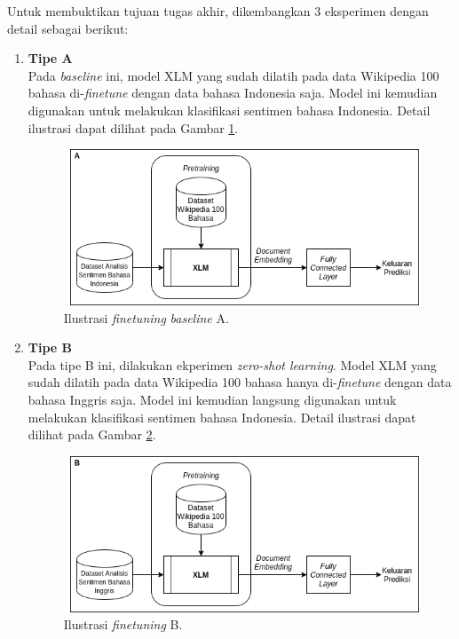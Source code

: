 	Untuk membuktikan tujuan tugas akhir, dikembangkan 3 eksperimen dengan detail sebagai berikut:
	\begin{enumerate}
		\item \textbf{Tipe A}\\
		Pada \textit{baseline} ini, model XLM yang sudah dilatih pada data Wikipedia 100 bahasa di-\textit{finetune} dengan data bahasa Indonesia saja. Model ini kemudian digunakan untuk melakukan klasifikasi sentimen bahasa Indonesia. Detail ilustrasi dapat dilihat pada Gambar \ref{fig:ilustrasi_solusi_1}.

		\begin{figure}[h]
		    \centering
		    \includegraphics[width=1\textwidth]{resources/Arsitektur-TA-1.png}
		    \caption{ Ilustrasi \textit{finetuning} \textit{baseline} A.}
		    \label{fig:ilustrasi_solusi_1}
		\end{figure}

		\item \textbf{Tipe B}\\
		Pada tipe B ini, dilakukan ekperimen \textit{zero-shot learning}. Model XLM yang sudah dilatih pada data Wikipedia 100 bahasa hanya di-\textit{finetune} dengan data bahasa Inggris saja. Model ini kemudian langsung digunakan untuk melakukan klasifikasi sentimen bahasa Indonesia. Detail ilustrasi dapat dilihat pada Gambar \ref{fig:ilustrasi_solusi_2}.

		\begin{figure}[h]
		    \centering
		    \includegraphics[width=1\textwidth]{resources/Arsitektur-TA-2.png}
		    \caption{ Ilustrasi \textit{finetuning} B.}
		    \label{fig:ilustrasi_solusi_2}
		\end{figure}


\end{enumerate}
